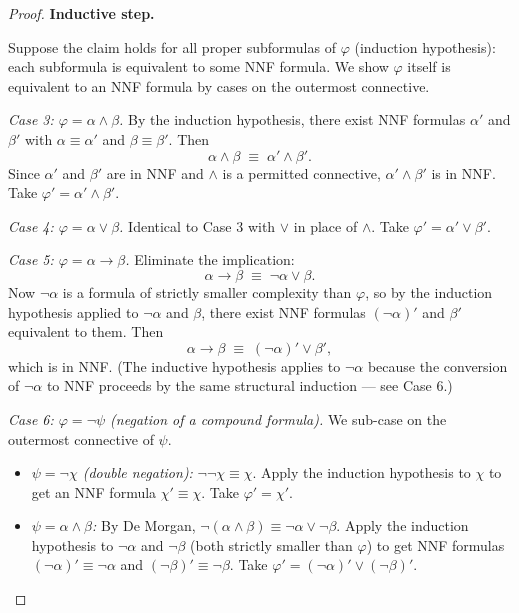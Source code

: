 \begin{proof}
\medskip
\noindent\textbf{Inductive step.}

Suppose the claim holds for all proper subformulas of $\varphi$ (induction
hypothesis): each subformula is equivalent to some NNF formula. We show
$\varphi$ itself is equivalent to an NNF formula by cases on the outermost
connective.

\medskip
\textit{Case 3: $\varphi = \alpha \wedge \beta$.}
By the induction hypothesis, there exist NNF formulas $\alpha'$ and $\beta'$
with $\alpha \equiv \alpha'$ and $\beta \equiv \beta'$. Then
\[
    \alpha \wedge \beta \;\equiv\; \alpha' \wedge \beta'.
\]
Since $\alpha'$ and $\beta'$ are in NNF and $\wedge$ is a permitted
connective, $\alpha' \wedge \beta'$ is in NNF. Take $\varphi' = \alpha'
\wedge \beta'$.

\medskip
\textit{Case 4: $\varphi = \alpha \vee \beta$.}
Identical to Case 3 with $\vee$ in place of $\wedge$. Take $\varphi' =
\alpha' \vee \beta'$.

\medskip
\textit{Case 5: $\varphi = \alpha \rightarrow \beta$.}
Eliminate the implication:
\[
    \alpha \rightarrow \beta \;\equiv\; \neg\alpha \vee \beta.
\]
Now $\neg\alpha$ is a formula of strictly smaller complexity than $\varphi$,
so by the induction hypothesis applied to $\neg\alpha$ and $\beta$, there
exist NNF formulas $(\neg\alpha)'$ and $\beta'$ equivalent to them. Then
\[
    \alpha \rightarrow \beta \;\equiv\; (\neg\alpha)' \vee \beta',
\]
which is in NNF. (The inductive hypothesis applies to $\neg\alpha$ because
the conversion of $\neg\alpha$ to NNF proceeds by the same structural
induction — see Case 6.)

\medskip
\textit{Case 6: $\varphi = \neg\psi$ (negation of a compound formula).}
We sub-case on the outermost connective of $\psi$.

\begin{itemize}
  \item \textit{$\psi = \neg\chi$ (double negation):}
        $\neg\neg\chi \equiv \chi$. Apply the induction hypothesis to $\chi$
        to get an NNF formula $\chi' \equiv \chi$. Take $\varphi' = \chi'$.

  \item \textit{$\psi = \alpha \wedge \beta$:}
        By De Morgan, $\neg(\alpha \wedge \beta) \equiv \neg\alpha \vee
        \neg\beta$. Apply the induction hypothesis to $\neg\alpha$ and
        $\neg\beta$ (both strictly smaller than $\varphi$) to get NNF
        formulas $(\neg\alpha)' \equiv \neg\alpha$ and $(\neg\beta)' \equiv
        \neg\beta$. Take $\varphi' = (\neg\alpha)' \vee (\neg\beta)'$.


\end{itemize}
\end{proof}
